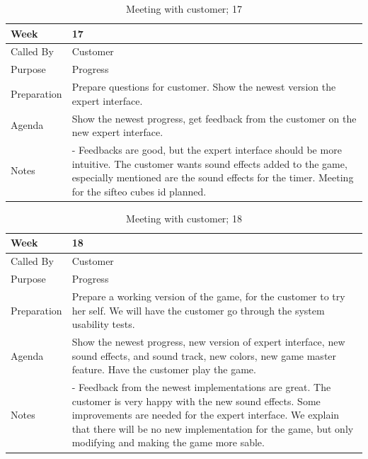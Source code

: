 {\footnotesize
\begin{table}[H]
\begin{tabular}{| p{5cm} | p{10cm} |}\hline
	\textbf{Week}	& \textbf{17} \\ \hline
	Called	By		& Customer\\ \hline
	Purpose		& Progress\\ \hline
	Preparation 
		& Prepare questions for customer. Show the newest version the expert interface.\\ 
		
	Agenda
		& Show the newest progress, get feedback from the customer on the new expert interface. \\

	Notes	& - Feedbacks are good, but the expert interface should be more intuitive. The customer wants sound effects added to the game, especially mentioned are the sound effects for the timer. Meeting for the sifteo cubes id planned.\\ \hline
	
\end{tabular}


\caption{Meeting with customer; 17}
\label{fig:meeting_17}
\end{table}}


{\footnotesize
\begin{table}[H]
\begin{tabular}{| p{5cm} | p{10cm} |}\hline
	\textbf{Week}	& \textbf{18} \\ \hline
	Called	By		& Customer\\ \hline
	Purpose		& Progress\\ \hline
	Preparation 
		& Prepare a working version of the game, for the customer to try her self. We will have the customer go through the system usability tests.\\ 
		
	Agenda
		& Show the newest progress, new version of expert interface, new sound effects, and sound track, new colors, new game master feature. Have the customer play the game. \\

	Notes	& - Feedback from the newest implementations are great. The customer is very happy with the new sound effects. Some improvements are needed for the expert interface. We explain that there will be no new implementation for the game, but only modifying and making the game more sable.\\ \hline
	
\end{tabular}


\caption{Meeting with customer; 18}
\label{fig:meeting_18}
\end{table}}



